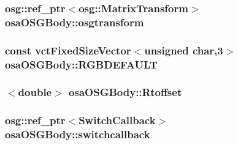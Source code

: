 \hypertarget{classosa_o_s_g_body_a7077ad80a1b17557f29ddda29ed0b7ec}{
\subsubsection[{osgtransform}]{\setlength{\rightskip}{0pt plus 5cm}osg\-::ref\-\_\-ptr$<$osg\-::\-Matrix\-Transform$>$ osa\-O\-S\-G\-Body\-::osgtransform\hspace{0.3cm}{\ttfamily [protected]}}}\label{classosa_o_s_g_body_a7077ad80a1b17557f29ddda29ed0b7ec}
\hypertarget{classosa_o_s_g_body_a1fb439b90b8d0277e28240e35de006dd}{
\subsubsection[{R\-G\-B\-D\-E\-F\-A\-U\-L\-T}]{\setlength{\rightskip}{0pt plus 5cm}const {\bf vct\-Fixed\-Size\-Vector}$<$unsigned char,3$>$ osa\-O\-S\-G\-Body\-::\-R\-G\-B\-D\-E\-F\-A\-U\-L\-T\hspace{0.3cm}{\ttfamily [static]}}}\label{classosa_o_s_g_body_a1fb439b90b8d0277e28240e35de006dd}
\hypertarget{classosa_o_s_g_body_ad008984bdb0eda300948932eda13974a}{
\subsubsection[{Rtoffset}]{$<$double$>$ osa\-O\-S\-G\-Body\-::\-Rtoffset\hspace{0.3cm}{\ttfamily [protected]}}}\label{classosa_o_s_g_body_ad008984bdb0eda300948932eda13974a}
\hypertarget{classosa_o_s_g_body_a5f183b1bed32990d46bfa30bc466391b}{
\subsubsection[{switchcallback}]{\setlength{\rightskip}{0pt plus 5cm}osg\-::ref\-\_\-ptr$<${\bf Switch\-Callback}$>$ osa\-O\-S\-G\-Body\-::switchcallback\hspace{0.3cm}{\ttfamily [protected]}}}\label{classosa_o_s_g_body_a5f183b1bed32990d46bfa30bc466391b}

